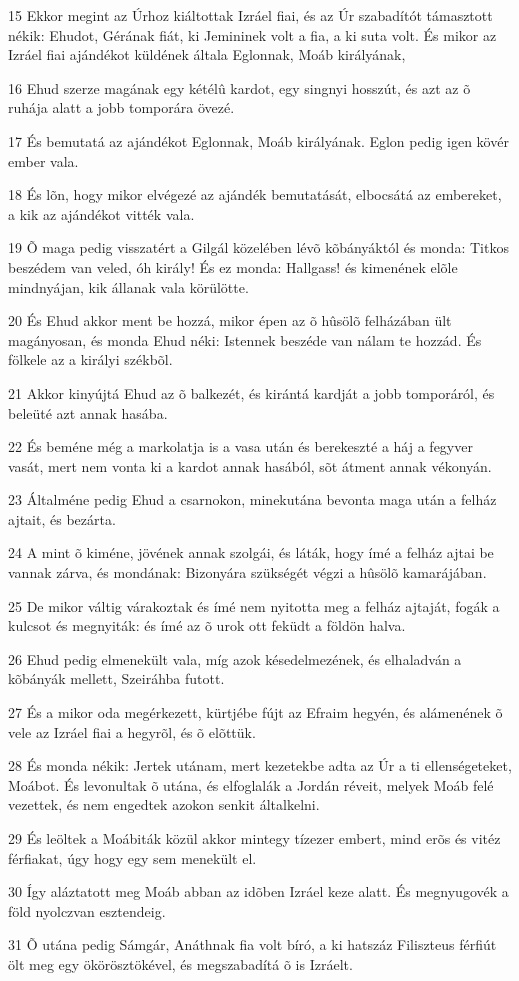 \par 15 Ekkor megint az Úrhoz kiáltottak Izráel fiai, és az Úr szabadítót támasztott nékik: Ehudot, Gérának fiát, ki Jemininek volt a fia, a ki suta volt. És mikor az Izráel fiai ajándékot küldének általa Eglonnak, Moáb királyának,
\par 16 Ehud szerze magának egy kétélû kardot, egy singnyi hosszút, és azt az õ ruhája alatt a jobb tomporára övezé.
\par 17 És bemutatá az ajándékot Eglonnak, Moáb királyának. Eglon pedig igen kövér ember vala.
\par 18 És lõn, hogy mikor elvégezé az ajándék bemutatását, elbocsátá az embereket, a kik az ajándékot vitték vala.
\par 19 Õ maga pedig visszatért a Gilgál közelében lévõ kõbányáktól és monda: Titkos beszédem van veled, óh király! És ez monda: Hallgass! és kimenének elõle mindnyájan, kik állanak vala körülötte.
\par 20 És Ehud akkor ment be hozzá, mikor épen az õ hûsölõ felházában ült magányosan, és monda Ehud néki: Istennek beszéde van nálam te hozzád. És fölkele az a királyi székbõl.
\par 21 Akkor kinyújtá Ehud az õ balkezét, és kirántá kardját a jobb tomporáról, és beleüté azt annak hasába.
\par 22 És beméne még a markolatja is a vasa után és berekeszté a háj a fegyver vasát, mert nem vonta ki a kardot annak hasából, sõt átment annak vékonyán.
\par 23 Általméne pedig Ehud a csarnokon, minekutána bevonta maga után a felház ajtait, és bezárta.
\par 24 A mint õ kiméne, jövének annak szolgái, és láták, hogy ímé a felház ajtai be vannak zárva, és mondának: Bizonyára szükségét végzi a hûsölõ kamarájában.
\par 25 De mikor váltig várakoztak és ímé nem nyitotta meg a felház ajtaját, fogák a kulcsot és megnyiták: és ímé az õ urok ott feküdt a földön halva.
\par 26 Ehud pedig elmenekült vala, míg azok késedelmezének, és elhaladván a kõbányák mellett, Szeiráhba futott.
\par 27 És a mikor oda megérkezett, kürtjébe fújt az Efraim hegyén, és alámenének õ vele az Izráel fiai a hegyrõl, és õ elõttük.
\par 28 És monda nékik: Jertek utánam, mert kezetekbe adta az Úr a ti ellenségeteket, Moábot. És levonultak õ utána, és elfoglalák a Jordán réveit, melyek Moáb felé vezettek, és nem engedtek azokon senkit általkelni.
\par 29 És leöltek a Moábiták közül akkor mintegy tízezer embert, mind erõs és vitéz férfiakat, úgy hogy egy sem menekült el.
\par 30 Így aláztatott meg Moáb abban az idõben Izráel keze alatt. És megnyugovék a föld nyolczvan esztendeig.
\par 31 Õ utána pedig Sámgár, Anáthnak fia volt bíró, a ki hatszáz Filiszteus férfiút ölt meg egy ökörösztökével, és megszabadítá õ is Izráelt.

